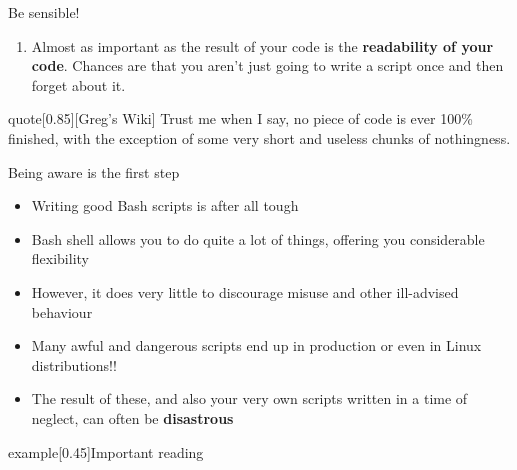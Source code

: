 \begin{frame}{Be sensible!}
{\begin{onlyenv}
\begin{enumerate}
                      Any script you'll find on the Web is likely to be broken in some way.
                      \alert{Do not copy/paste from them!}
                \item Almost as important as the result of your code is the \textbf{readability of your code}.
                      Chances are that you aren't just going to write a script once and then forget about it.
            \end{enumerate}
            \begin{varblock}{quote}[0.85\textwidth]{}[Greg's Wiki]
                Trust me when I say, no piece of code is ever 100\% finished, with the exception of some very short and useless chunks of nothingness.
            \end{varblock}
        \end{onlyenv}
    }
\end{frame}
\begin{frame}{Being aware is the first step}
    \begin{itemize}
        \item Writing good Bash scripts is after all tough
        \item Bash shell allows you to do quite a lot of things, offering you considerable flexibility
        \item However, it does very little to discourage misuse and other ill-advised behaviour
        \item Many awful and dangerous scripts end up in production or even in Linux distributions!!
        \item The result of these, and also your very own scripts written in a time of neglect, can often be \textbf{disastrous}
    \end{itemize}
    \begin{varblock*}{example}[0.45\textwidth]{Important reading}
        \\
        \\
    \end{varblock*}
\end{frame}
